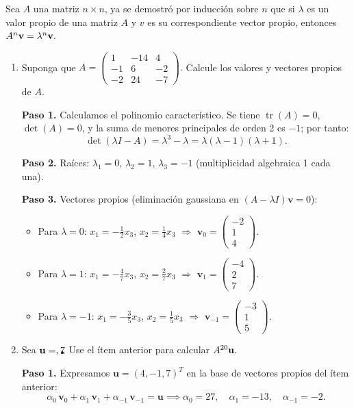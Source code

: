 \begin{prob}
Sea $A$ una matriz $n\times n$, ya se demostró por inducción sobre $n$ que si $\lambda$ es un valor propio de una matriz $A$ y $v$ es su correspondiente vector propio, entonces $A^{n}{\bf{v}}=\lambda^{n}{\bf{v}}.$  
\begin{enumerate}[$a)$]
\item Suponga que $A=\begin{pmatrix} 1&-14&4 \\ -1&6&-2\\ -2&24&-7
\end{pmatrix}.$ Calcule los valores y vectores propios de $A.$
\begin{myproof}
\textbf{Paso 1.} Calculamos el polinomio característico. Se tiene $\operatorname{tr}(A)=0$, $\det(A)=0$, y la suma de menores principales de orden 2 es $-1$; por tanto:
\[
\det(\lambda I - A) = \lambda^3 - \lambda = \lambda(\lambda-1)(\lambda+1).
\]

\textbf{Paso 2.} Raíces: $\lambda_1=0$, $\lambda_2=1$, $\lambda_3=-1$ (multiplicidad algebraica 1 cada una).

\textbf{Paso 3.} Vectores propios (eliminación gaussiana en $(A-\lambda I)\mathbf{v}=0$):
\begin{itemize}
  \item Para $\lambda=0$: $x_1=-\tfrac{1}{2}x_3$, $x_2=\tfrac{1}{4}x_3$ $\Rightarrow$ $\mathbf{v}_0 = \begin{pmatrix}-2\\1\\4\end{pmatrix}$.
  \item Para $\lambda=1$: $x_1=-\tfrac{4}{7}x_3$, $x_2=\tfrac{2}{7}x_3$ $\Rightarrow$ $\mathbf{v}_1 = \begin{pmatrix}-4\\2\\7\end{pmatrix}$.
  \item Para $\lambda=-1$: $x_1=-\tfrac{3}{5}x_3$, $x_2=\tfrac{1}{5}x_3$ $\Rightarrow$ $\mathbf{v}_{-1} = \begin{pmatrix}-3\\1\\5\end{pmatrix}$.
\end{itemize}
\end{myproof}

\item Sea ${\bf{u}}=\vector(4,-1,7).$ Use el ítem anterior para calcular $A^{20}{\bf{u}}.$
\begin{myproof}
\textbf{Paso 1.} Expresamos $\mathbf{u}=(4,-1,7)^T$ en la base de vectores propios del ítem anterior:
\[
\alpha_0\,\mathbf{v}_0 + \alpha_1\,\mathbf{v}_1 + \alpha_{-1}\,\mathbf{v}_{-1} = \mathbf{u}
\implies \alpha_0=27,\quad \alpha_1=-13,\quad \alpha_{-1}=-2.
\]


\end{myproof}
\end{enumerate}
\end{prob}
